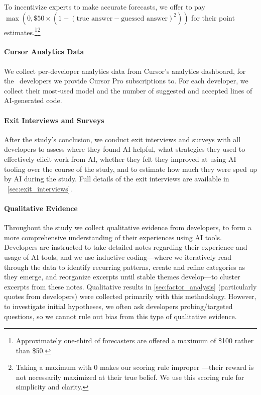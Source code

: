 \documentclass{article}
\begin{document}
To incentivize experts to make accurate forecasts, we offer to pay $\max(0, \$50 \times (1 - (\text{true answer} - \text{guessed answer})^2))$ for their point estimates.\footnote{Approximately one-third of forecasters are offered a maximum of \$100 rather than \$50.}\footnote{Taking a maximum with 0 makes our scoring rule improper \cite{Gneiting01032007}---their reward is not necessarily maximized at their true belief. We use this scoring rule for simplicity and clarity.} 


\paragraph*{Cursor Analytics Data}
We collect per-developer analytics data from Cursor's analytics dashboard, for the \NumDevelopersWithCursorData\ developers we provide Cursor Pro subscriptions to. For each developer, we collect their most-used model and the number of suggested and accepted lines of AI-generated code.

\paragraph*{Exit Interviews and Surveys} 
After the study's conclusion, we conduct exit interviews and surveys with all developers to assess where they found AI helpful, what strategies they used to effectively elicit work from AI, whether they felt they improved at using AI tooling over the course of the study, and to estimate how much they were sped up by AI during the study. Full details of the exit interviews are available in ~\autoref{sec:exit_interviews}.

\paragraph*{Qualitative Evidence} 
Throughout the study we collect qualitative evidence from developers, to form a more comprehensive understanding of their experiences using AI tools. Developers are instructed to take detailed notes regarding their experience and usage of AI tools, and we use inductive coding---where we iteratively read through the data to identify recurring patterns, create and refine categories as they emerge, and reorganize excerpts until stable themes develop---to cluster excerpts from these notes. Qualitative results in \autoref{sec:factor_analysis} (particularly quotes from developers) were collected primarily with this methodology. However, to investigate initial hypotheses, we often ask developers probing/targeted questions, so we cannot rule out bias from this type of qualitative evidence.
\end{document}
